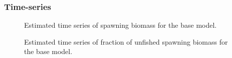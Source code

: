 \documentclass[
]{scrartcl}
\begin{document}
\newpage

\subsubsection{Time-series}\label{time-series}

\begin{figure}[H]


\caption{\label{fig-sb}Estimated time series of spawning biomass for the
base model.}

\end{figure}%

\begin{figure}[H]


\caption{\label{fig-depl}Estimated time series of fraction of unfished
spawning biomass for the base model.}

\end{figure}%
\end{document}
